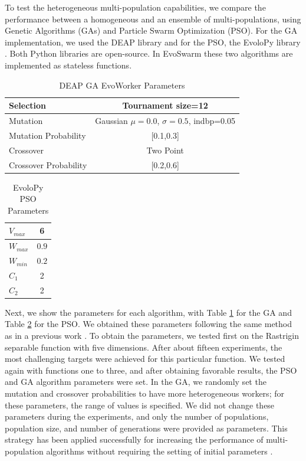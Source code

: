\documentclass[review]{elsarticle}
\begin{document}
To test the heterogeneous multi-population capabilities,  we compare the
performance between a homogeneous and an ensemble of multi-populations, using
Genetic Algorithms (GAs) and Particle Swarm Optimization (PSO). For the GA
implementation, we used the DEAP library \cite{fortin2012deap} and for the PSO,
the EvoloPy library \cite{faris2016evolopy}. Both Python libraries are
open-source. In EvoSwarm these two algorithms are implemented as stateless
functions.

\begin{table}[h!tbp]
  \small
  \caption{DEAP GA EvoWorker Parameters }
  \label{tab:GAparams} 
  \centering
  \small
  \begin{tabular}{|l|c|}
    \hline
    Selection & Tournament size=12                            \\ \hline
    Mutation & Gaussian $\mu=0.0$, $\sigma=0.5$, indbp=0.05   \\ \hline
    Mutation Probability & [0.1,0.3]                          \\ \hline
    Crossover & Two Point                                     \\ \hline
    Crossover Probability  & [0.2,0.6]                          \\ \hline
  \end{tabular}
\end{table}
%
\begin{table}[h!tbp]
  \small
  \caption{ EvoloPy PSO Parameters }
  \label{tab:PSOparams} 
  \centering
  \small
  \begin{tabular}{|l|c|}
    \hline
    $V_{max}$ & 6 \\ \hline
    $W_{max}$ & $0.9$ \\ \hline
    $W_{min}$ & $0.2$ \\ \hline
    $C_1$ & 2 \\ \hline
    $C_2$ & 2 \\ \hline
  \end{tabular}
\end{table}

Next, we show the parameters for each algorithm, with Table
\ref{tab:GAparams} for the GA and Table \ref{tab:PSOparams} for the
PSO. We obtained these parameters following the same method as in a
previous work \cite{garcia2017benchmarking}.  To obtain the
parameters, we tested first on the Rastrigin separable function with
five dimensions. After about fifteen experiments, the most challenging
targets were achieved for this particular function. We tested again
with functions one to three, and after obtaining favorable results,
the PSO and GA algorithm parameters were set. In the GA, we randomly
set the mutation and crossover probabilities to have more
heterogeneous workers; for these parameters, the range of values is
specified. We did not change these parameters during the experiments,
and only the number of populations, population size, and number of
generations were provided as parameters. This strategy has been
applied successfully for increasing the performance of
multi-population algorithms without requiring the setting of initial
parameters \cite{garcia2014randomized}.
\end{document}
